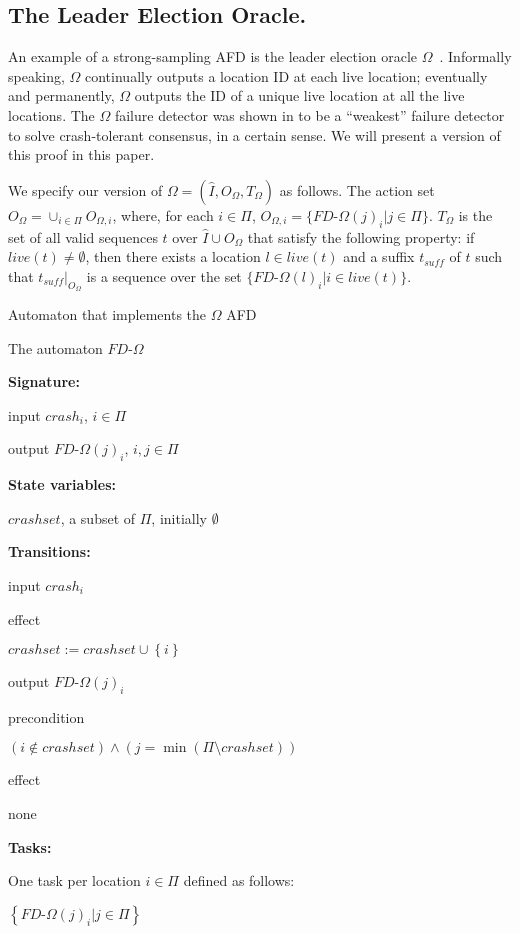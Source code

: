\documentclass[11pt]{article}
\numberwithin{theorem}{section}
\newcommand{\tab}{\hspace{5mm}}
\newcommand{\set}[1]{\left\{#1\right\}}
\begin{document}
\subsection{The Leader Election Oracle.} 
\label{subset:omegaDef}

An example of a strong-sampling AFD is the leader election oracle
$\Omega$~\cite{chan:twfdf}.
Informally speaking, $\Omega$ continually outputs a location ID at
each live location; eventually and permanently, $\Omega$ outputs the
ID of a unique live location at all the live locations.
The $\Omega$ failure detector was shown in \cite{chan:twfdf} to be a
``weakest'' failure detector to solve crash-tolerant consensus, in a
certain sense. 
We will present a version of this proof in this paper.

We specify our version  of $\Omega = (\hat{I},O_\Omega,T_\Omega)$
as follows.
The action set $O_\Omega = \cup_{i \in \Pi}O_{{\Omega},i}$, where, for
each $i \in \Pi$, $O_{\Omega,i} = \{ FD\text{-}\Omega(j)_i|j \in
\Pi\}$. 
$T_\Omega$ is the set of all valid sequences $t$ over $\hat{I} \cup
O_\Omega$ that satisfy the following property:  
if $live(t) \neq \emptyset$, then there exists a location $l \in
live(t)$ and a suffix $t_{suff}$ of $t$ such that
$t_{suff}|_{O_\Omega}$ is a sequence over the set $\{FD\text{-}\Omega(l)_i|i \in live(t)\}$.

\begin{algorithm}\footnotesize
\caption{Automaton that implements the $\Omega$ AFD}
\label{alg:OmegaAutomaton}
The automaton $FD\text{-}\Omega$

\textbf{Signature:}

\tab input $crash_i$, $i \in \Pi$ 

\tab output $FD\text{-}\Omega(j)_i$, $i,j \in \Pi$


\textbf{State variables:}

\tab $crashset$, a subset of $\Pi$, initially $\emptyset$

\textbf{Transitions:}

\tab input $crash_i$

\tab effect

\tab \tab $crashset := crashset \cup \set{i}$

\tab

\tab output $FD\text{-}\Omega(j)_i$

\tab precondition

\tab \tab $(i\notin crashset) \wedge (j = \min (\Pi \setminus crashset))$

\tab effect

\tab \tab none

\textbf{Tasks:}

\tab One task per location $i \in \Pi$ defined as follows:

\tab \tab $\set{FD\text{-}\Omega(j)_i|j \in \Pi}$

\end{algorithm}
 
\end{document}
